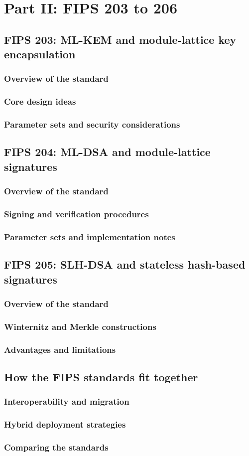 \part{Part II: FIPS 203 to 206}
\chapter{FIPS 203: ML-KEM and module-lattice key encapsulation}
\section{Overview of the standard}
\section{Core design ideas}
\section{Parameter sets and security considerations}

\chapter{FIPS 204: ML-DSA and module-lattice signatures}
\section{Overview of the standard}
\section{Signing and verification procedures}
\section{Parameter sets and implementation notes}

\chapter{FIPS 205: SLH-DSA and stateless hash-based signatures}
\section{Overview of the standard}
\section{Winternitz and Merkle constructions}
\section{Advantages and limitations}

\chapter{How the FIPS standards fit together}
\section{Interoperability and migration}
\section{Hybrid deployment strategies}
\section{Comparing the standards}
